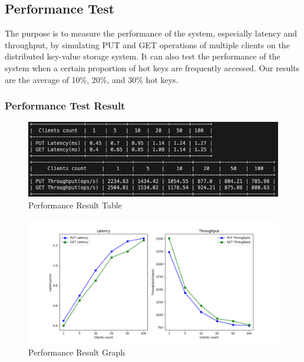 \documentclass{article}
\begin{document}
\subsection{Performance Test}
The purpose is to measure the performance of the system, especially latency and throughput, by simulating PUT and GET operations of multiple clients on the distributed key-value storage system. It can also test the performance of the system when a certain proportion of hot keys are frequently accessed. Our results are the average of 10\%, 20\%, and 30\% hot keys.

\subsubsection{Performance Test Result}
\begin{figure}[H]  
    \centering
    \includegraphics[width=1\textwidth]{ptn_performance_output_table.png}  
    \caption{Performance Result Table}
\end{figure}
\begin{figure}[H]  
    \centering
    \includegraphics[width=1\textwidth]{ptn_performance_output_plot.png}  
    \caption{Performance Result Graph}
\end{figure}
\end{document}
